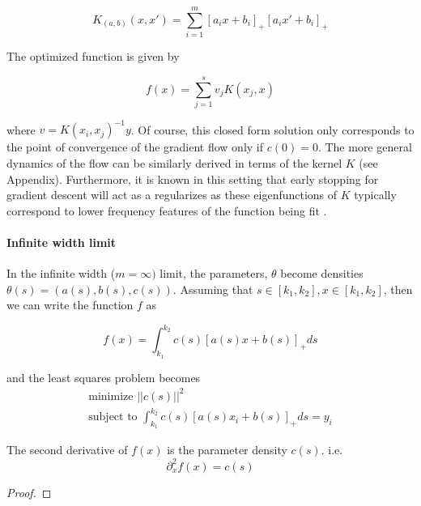 \begin{equation}
    K_{(a,b)}(x,x') = \sum_{i=1}^m [a_i x + b_i]_+[a_i x' + b_i]_+
\end{equation}


The optimized function is given by

\begin{equation}
    f(x) = \sum_{j=1}^s v_j K(x_j, x)
\end{equation}


where $v = K(x_i,x_j)^{-1} y$. Of course, this closed form solution only corresponds to the point of convergence of the gradient flow only if $c(0) = 0$. The more general dynamics of the flow can be similarly derived in terms of the kernel $K$ (see Appendix). Furthermore, it is known in this setting that early stopping for
gradient descent will act as a regularizes as these eigenfunctions of $K$ typically correspond to lower frequency features of the function being fit .







\paragraph{Infinite width limit}
In the infinite width ($m = \infty)$ limit, the parameters, $\theta$ become densities $\theta(s) = (a(s), b(s), c(s))$. Assuming that $s \in [k_1, k_2], x \in [k_1, k_2]$, then we can write the function $f$ as

\begin{equation}
    f(x) = \int_{k_1}^{k_2} c(s) [a(s) x + b(s)]_+ ds
\end{equation}

and the least squares problem becomes
\begin{equation}
    \begin{gathered}
    \text{minimize } ||c(s)||^2\\
    \text{subject to } \int_{k_1}^{k_2} c(s) [a(s)x_i + b(s)]_+ ds = y_i
    \end{gathered}
\end{equation}

\begin{lemma}\label{le:curvature}
The second derivative of $f(x)$ is the parameter density $c(s)$. i.e. 
\begin{equation*}\partial_x^2 f(x) = c(s)\end{equation*}
\end{lemma}
\begin{proof}
\end{proof}

